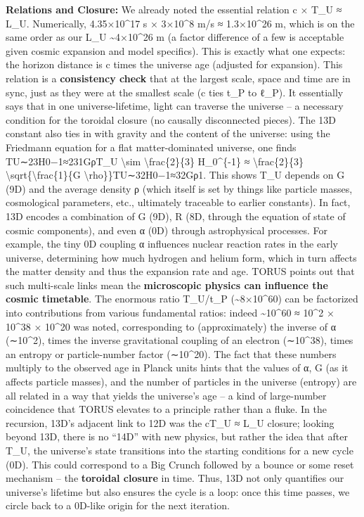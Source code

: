 \textbf{Relations and Closure:} We already noted the essential relation
c × T\_U ≈ L\_U​. Numerically, 4.35×10\^{}17 s × 3×10\^{}8 m/s ≈
1.3×10\^{}26 m, which is on the same order as our L\_U
\textasciitilde{}4×10\^{}26 m (a factor difference of a few is
acceptable given cosmic expansion and model specifics)​. This is exactly
what one expects: the horizon distance is c times the universe age
(adjusted for expansion). This relation is a \textbf{consistency check}
that at the largest scale, space and time are in sync, just as they were
at the smallest scale (c ties t\_P to ℓ\_P). It essentially says that in
one universe-lifetime, light can traverse the universe -- a necessary
condition for the toroidal closure (no causally disconnected pieces)​.
The 13D constant also ties in with gravity and the content of the
universe: using the Friedmann equation for a flat matter-dominated
universe, one finds TU∼23H0−1≈231GρT\_U \textbackslash{}sim
\textbackslash{}frac\{2\}\{3\} H\_0\^{}\{-1\} ≈
\textbackslash{}frac\{2\}\{3\}
\textbackslash{}sqrt\{\textbackslash{}frac\{1\}\{G
\textbackslash{}rho\}\}TU​∼32​H0−1​≈32​Gρ1​​​. This shows T\_U depends
on G (9D) and the average density ρ (which itself is set by things like
particle masses, cosmological parameters, etc., ultimately traceable to
earlier constants). In fact, 13D encodes a combination of G (9D), R (8D,
through the equation of state of cosmic components), and even α (0D)
through astrophysical processes​. For example, the tiny 0D coupling α
influences nuclear reaction rates in the early universe, determining how
much hydrogen and helium form, which in turn affects the matter density
and thus the expansion rate and age. TORUS points out that such
multi-scale links mean the \textbf{microscopic physics can influence the
cosmic timetable}. The enormous ratio T\_U/t\_P
(\textasciitilde{}8×10\^{}60) can be factorized into contributions from
various fundamental ratios: indeed \textasciitilde{}10\^{}60 ≈ 10\^{}2 ×
10\^{}38 × 10\^{}20 was noted​, corresponding to (approximately) the
inverse of α (∼10\^{}2), times the inverse gravitational coupling of an
electron (∼10\^{}38), times an entropy or particle-number factor
(∼10\^{}20). The fact that these numbers multiply to the observed age in
Planck units hints that the values of α, G (as it affects particle
masses), and the number of particles in the universe (entropy) are all
related in a way that yields the universe's age -- a kind of
large-number coincidence that TORUS elevates to a principle rather than
a fluke​. In the recursion, 13D's adjacent link to 12D was the cT\_U ≈
L\_U closure; looking beyond 13D, there is no ``14D'' with new physics,
but rather the idea that after T\_U, the universe's state transitions
into the starting conditions for a new cycle (0D)​. This could
correspond to a Big Crunch followed by a bounce or some reset mechanism
-- the \textbf{toroidal closure} in time. Thus, 13D not only quantifies
our universe's lifetime but also ensures the cycle is a loop: once this
time passes, we circle back to a 0D-like origin for the next iteration.

